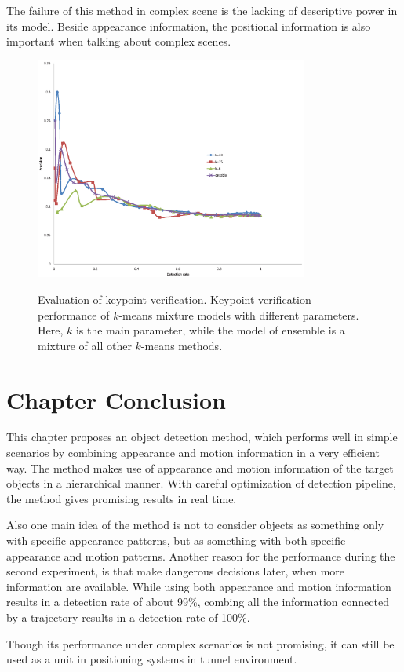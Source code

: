 The failure of this method in complex scene is the lacking of descriptive power in its model. Beside appearance information, the positional information is also important when talking about complex scenes. 

\begin{figure}
\centering
{
  \includegraphics[width=0.8\textwidth]{kptkms.eps}
}
\caption[Evaluation of keypoint verification]{Evaluation of keypoint verification. Keypoint verification performance of $k$-means mixture models with different parameters. Here, $k$ is the main parameter, while the model of ensemble is a mixture of all other $k$-means methods.}
\label{ord:one}
\end{figure}

\section{Chapter Conclusion}
\label{conc}
 This chapter proposes an object detection method, which performs well in simple scenarios by combining appearance and motion information in a very efficient way. The method makes use of appearance and motion information of the target objects in a hierarchical manner. With careful optimization of detection pipeline, the method gives promising results in real time.

  Also one main idea of the method is not to consider objects as something only with specific appearance patterns, but as something with both
 specific appearance and motion patterns. Another reason for the performance during the second experiment, is that make dangerous decisions later, when more information are available. While using both appearance and motion information results in a detection rate of about 99\%, combing all the information connected by a trajectory results in a detection rate of 100\%.

 Though its performance under complex scenarios is not promising, it can still be used as a unit in  positioning systems in tunnel environment.
